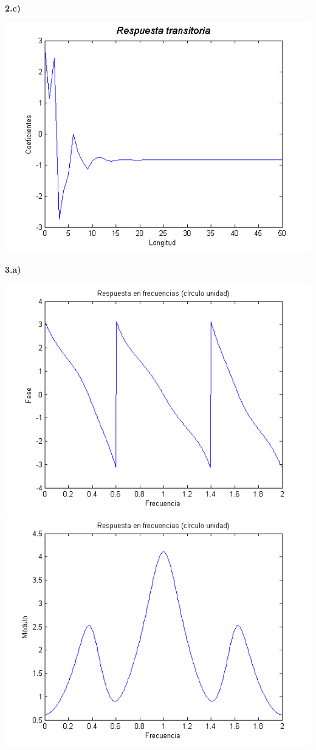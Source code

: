 \documentclass[a4paper,12pt]{article}
\begin{document}


\textbf{2.c)}\\

\begin{center}
\includegraphics[width=.8 \textwidth]{ejercicio-4-2-c.png}
\end{center}



\textbf{3.a)}\\

\begin{center}
\includegraphics[width=.8 \textwidth]{ejercicio-4-3-a-fase.png}\\
\includegraphics[width=.8 \textwidth]{ejercicio-4-3-a-modulo.png}
\end{center}
\end{document}
